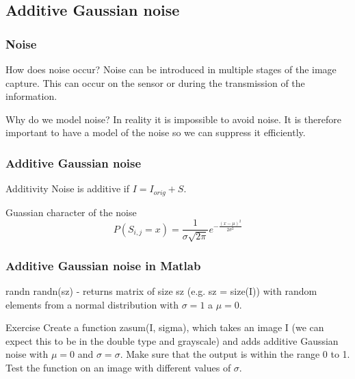 \documentclass{beamer}
\begin{document}
\subsection{Additive Gaussian noise}
\begin{frame}
\frametitle{Noise}
\begin{block}{How does noise occur?}
Noise can be introduced in multiple stages of the image capture. This can occur on the sensor or during the transmission of the information.
\end{block}

\begin{block}{Why do we model noise?}
In reality it is impossible to avoid noise. It is therefore important to have a model of the noise so we can suppress it efficiently.
\end{block}
\end{frame}

\begin{frame}
\frametitle{Additive Gaussian noise}
\begin{block}{Additivity}
Noise is additive if $I = I_{orig} + S$.
\end{block}

\begin{block}{Guassian character of the noise}
\begin{equation}
P(S_{i,j} = x) = \frac{1}{\sigma \sqrt{2\pi}} e^{-\frac{(x-\mu)^2}{2\sigma^2}}
\end{equation}
\end{block}

\noindent{}
\end{frame}

\begin{frame}
\frametitle{Additive Gaussian noise in Matlab}
\begin{block}{randn}
randn(sz) - returns matrix of size sz (e.g. sz = size(I)) with random elements from a normal distribution with $\sigma = 1$ a $\mu = 0$.
\end{block}

\begin{block}{Exercise}
Create a function zasum(I, sigma), which takes an image I (we can expect this to be in the double type and grayscale) and adds additive Gaussian noise with $\mu = 0$ and $\sigma = \sigma$. Make sure that the output is within the range 0 to 1. Test the function on an image with different values of $\sigma$.
\end{block}
\end{frame}
\end{document}
